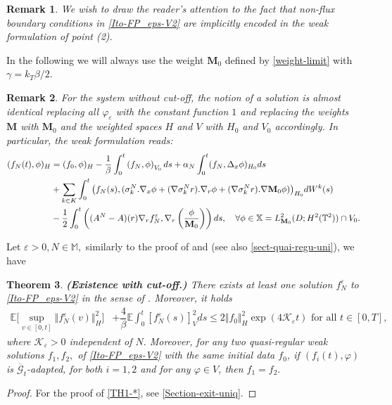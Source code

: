 \documentclass[a4paper,12pt, reqno]{amsart}
\newcommand{\E}{\ensuremath{\mathbb{E}}}
\newtheorem{theorem}{Theorem}
\newtheorem{remark}[theorem]{Remark}
\newcommand{\M}{\mathbf{M}}
\begin{document}
    \begin{remark}
    We wish to draw the reader’s attention to the fact that non-flux boundary conditions in \eqref{Ito-FP_eps-V2} are implicitly encoded in the weak formulation of point (2).
\end{remark}
    In the following we will always use the weight $\M_0$ defined by \eqref{weight-limit} with $\gamma = k_T \beta /2$.
\begin{remark}\label{rmk:def_sol_nocutoff}
    For the system without cut-off, the notion of a solution is almost identical replacing all $\varphi_\varepsilon$ with the constant function $1$ and replacing the weights $\M$ with $\M_0$ and the weighted spaces $H$ and $V$ with $H_0$ and $V_0$ accordingly. In particular, the weak formulation reads:
    \begin{align*}
                    (f_N(t), \phi )_H 
        &=(f_0, \phi )_H-\dfrac{1}{\beta}\int_0^t\left(f_N , \phi \right)_{V_0}ds+\alpha_N\int_0^t( f_N,\Delta_x \phi)_{H_0} ds\\&+\sum_{k\in K}\int_0^t\big(f_N(s),( \sigma_k^N.\nabla_x\phi +(\nabla \sigma_k^Nr).\nabla_r \phi+(\nabla \sigma_k^Nr).\nabla \M_0\phi)\big)_{H_0}dW^k(s)\notag\\
        & - \dfrac{1}{2}\int_0^t\left((A^N-A)(r)\nabla_rf^\varepsilon_N,\nabla_r\left(\dfrac{\phi}{\mathbf{M}_0}\right)\right) ds, \quad \forall \phi\in \mathbb{X}= L^2_{\mathbf{M}_0} (D;H^2(\mathbb{T}^2)) \cap V_0. \notag\end{align*}
\end{remark}
 Let $\varepsilon>0, N\in \mathbb{M},$    similarly to the proof of  \cite[Theorem 7]{Flandoli-Tahraoui}  and  \cite[Theorem 8]{Flandoli-Tahraoui} (see also \autoref{sect-quai-regu-uni}),  we have
\begin{theorem}\label{TH1-*}\textbf{(Existence with cut-off.)} There exists  at    least   one     solution $f^\varepsilon_N$ to  \eqref{Ito-FP_eps-V2} in the sense of  . Moreover,  it holds 
\begin{align}\label{estimate-solution}
 \E\Big[\sup_{v\in[0,t]} \Vert f^\varepsilon_N(v)\Vert_H^2  \Big]&+\dfrac{4}{\beta}\E\int_0^t [f^\varepsilon_N(s)]_V^2ds\leq 2\Vert f_{0}\Vert_H^2\exp{(4\mathcal{K}_\varepsilon t)} \text{ for all } t\in [0,T],
\end{align}
where $\mathcal{K}_\varepsilon>0$ independent of $N.$
Moreover, for any two quasi-regular weak   solutions $f_1, f_2,$   of  \eqref{Ito-FP_eps-V2}  with    the same    initial data    $f_0$,  if   $(f_i(t),\varphi)$    is  $\overline{\mathcal{G}}_t$-adapted, for both    $i=1,2$ and for    any $\varphi\in V$, then   $f_1=f_2.$
\end{theorem}
    \begin{proof}
    For the proof of \autoref{TH1-*},   see \autoref{Section-exit-uniq}.
    \end{proof}
\end{document}
